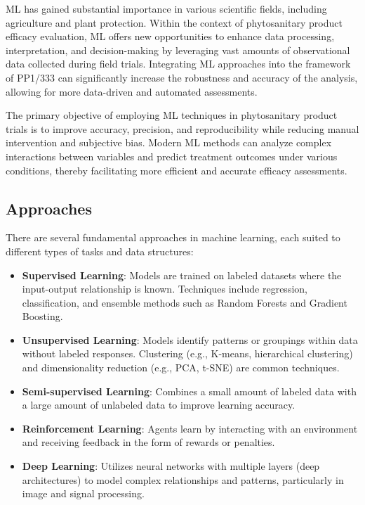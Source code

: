 \documentclass[12pt,a4paper,oneside]{report}
\begin{document}
ML has gained substantial importance in various scientific fields, including 
agriculture and plant protection. Within the context of phytosanitary product 
efficacy evaluation, ML offers new opportunities to enhance data processing, 
interpretation, and decision-making by leveraging vast amounts of observational 
data collected during field trials. Integrating ML approaches into the framework 
of PP1/333 can significantly increase the robustness and accuracy of the analysis, 
allowing for more data-driven and automated assessments.

The primary objective of employing ML techniques in phytosanitary product trials 
is to improve accuracy, precision, and reproducibility while reducing manual 
intervention and subjective bias. Modern ML methods can analyze complex interactions 
between variables and predict treatment outcomes under various conditions, thereby 
facilitating more efficient and accurate efficacy assessments.

\subsection{Approaches}

There are several fundamental approaches in machine learning, each suited to different 
types of tasks and data structures:

\begin{itemize}
    \item \textbf{Supervised Learning}: Models are trained on labeled datasets where 
    the input-output relationship is known. Techniques include regression, classification, 
    and ensemble methods such as Random Forests and Gradient Boosting.
    \item \textbf{Unsupervised Learning}: Models identify patterns or groupings within 
    data without labeled responses. Clustering (e.g., K-means, hierarchical clustering) 
    and dimensionality reduction (e.g., PCA, t-SNE) are common techniques.
    \item \textbf{Semi-supervised Learning}: Combines a small amount of labeled data with 
    a large amount of unlabeled data to improve learning accuracy.
    \item \textbf{Reinforcement Learning}: Agents learn by interacting with an environment 
    and receiving feedback in the form of rewards or penalties.
    \item \textbf{Deep Learning}: Utilizes neural networks with multiple layers 
    (deep architectures) to model complex relationships and patterns, particularly 
    in image and signal processing.
\end{itemize}
\end{document}
